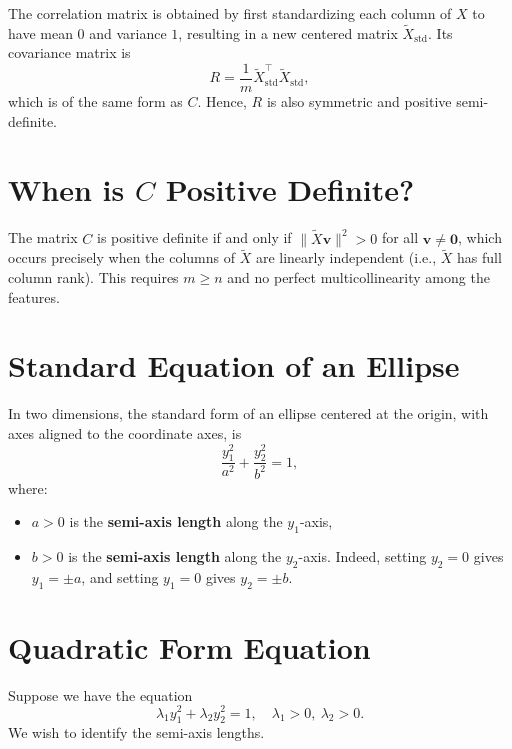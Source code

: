 \documentclass{article}
\begin{document}
The correlation matrix is obtained by first standardizing each column of $X$ to have mean $0$ and variance $1$, resulting in a new centered matrix $\tilde{X}_{\text{std}}$.  
Its covariance matrix is
\[
R = \frac{1}{m} \tilde{X}_{\text{std}}^\top \tilde{X}_{\text{std}},
\]
which is of the same form as $C$. Hence, $R$ is also symmetric and positive semi-definite.

\section*{When is $C$ Positive Definite?}

The matrix $C$ is positive definite if and only if $\| \tilde{X} \mathbf{v} \|^2 > 0$ for all $\mathbf{v} \neq \mathbf{0}$,  
which occurs precisely when the columns of $\tilde{X}$ are linearly independent (i.e., $\tilde{X}$ has full column rank).  
This requires $m \geq n$ and no perfect multicollinearity among the features.















\section*{Standard Equation of an Ellipse}

In two dimensions, the standard form of an ellipse centered at the origin, with axes aligned to the coordinate axes, is
\[
\frac{y_1^2}{a^2} + \frac{y_2^2}{b^2} = 1,
\]
where:
\begin{itemize}
\item $ a > 0 $ is the \textbf{semi-axis length} along the $ y_1 $-axis,
    \item $ b > 0 $ is the \textbf{semi-axis length} along the $ y_2 $-axis.
Indeed, setting $ y_2 = 0 $ gives $ y_1 = \pm a $, and setting $ y_1 = 0 $ gives $ y_2 = \pm b $.
\end{itemize}

\section*{Quadratic Form Equation}

Suppose we have the equation
\[
\lambda_1 y_1^2 + \lambda_2 y_2^2 = 1, \quad \lambda_1 > 0,\ \lambda_2 > 0.
\]
We wish to identify the semi-axis lengths.
\end{document}
